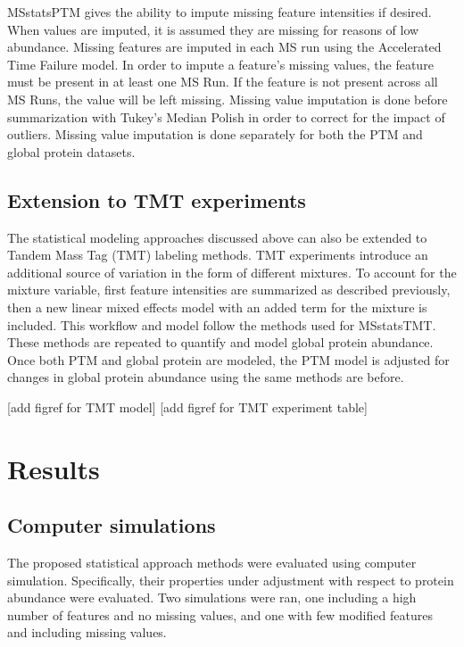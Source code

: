 \documentclass[mcp]{article}
\numberwithin{figure}{section} %
\numberwithin{table}{section}
\def\todo#1{{\color{red}[#1]}}
\begin{document}
MSstatsPTM gives the ability to impute missing feature intensities if desired. When values are imputed, it is assumed they are missing for reasons of low abundance. Missing features are imputed in each MS run using the Accelerated Time Failure model.\cite{Tukey:1977} In order to impute a feature's missing values, the feature must be present in at least one MS Run. If the feature is not present across all MS Runs, the value will be left missing. Missing value imputation is done before summarization with Tukey's Median Polish in order to correct for the impact of outliers. Missing value imputation is done separately for both the PTM and global protein datasets.

\subsection*{Extension to TMT experiments}

The statistical modeling approaches discussed above can also be extended to Tandem Mass Tag (TMT) labeling methods. TMT experiments introduce an additional source of variation in the form of different mixtures. To account for the mixture variable, first feature intensities are summarized as described previously, then a new linear mixed effects model with an added term for the mixture is included. This workflow and model follow the methods used for MSstatsTMT. \cite{Huang:2020} These methods are repeated to quantify and model global protein abundance. Once both PTM and global protein are modeled, the PTM model is adjusted for changes in global protein abundance using the same methods are before.

\todo{add figref for TMT model}
\todo{add figref for TMT experiment table}

\section{Results}

\subsection*{Computer simulations}
\label{sec:comp_sim}

The proposed statistical approach methods were evaluated using computer simulation. Specifically, their properties under adjustment with respect to protein abundance were evaluated. Two simulations were ran, one including a high number of features and no missing values, and one with few modified features and including missing values.
\end{document}
